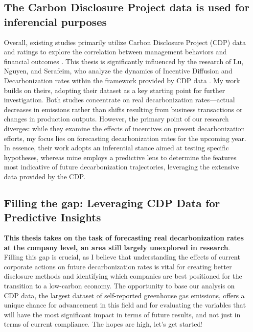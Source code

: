 \subsection{The Carbon Disclosure Project data is used for inferencial purposes}
Overall, existing studies primarily utilize Carbon Disclosure Project (CDP) data and ratings to explore the correlation between management behaviors and financial outcomes \cite{nguyen-ml, ben-amar, teob, Hassan2013Carbon}. This thesis is significantly influenced by the research of Lu, Nguyen, and Serafeim, who analyze the dynamics of Incentive Diffusion and Decarbonization rates within the framework provided by CDP data \cite{incentive-diffusion}. My work builds on theirs, adopting their dataset as a key starting point for further investigation. Both studies concentrate on real decarbonization rates—actual decreases in emissions rather than shifts resulting from business transactions or changes in production outputs. However, the primary point of our research diverges: while they examine the effects of incentives on present decarbonization efforts, my focus lies on forecasting decarbonization rates for the upcoming year. In essence, their work adopts an inferential stance aimed at testing specific hypotheses, whereas mine employs a predictive lens to determine the features most indicative of future decarbonization trajectories, leveraging the extensive data provided by the CDP.



\subsection{Filling the gap: Leveraging CDP Data for Predictive Insights}
\textbf{This thesis takes on the task of forecasting real decarbonization rates at the company level, an area still largely unexplored in research}. Filling this gap is crucial, as I believe that understanding the effects of current corporate actions on future decarbonization rates is vital for creating better disclosure methods and identifying which companies are best positioned for the transition to a low-carbon economy. The opportunity to base our analysis on CDP data, the largest dataset of self-reported greenhouse gas emissions, offers a unique chance for advancement in this field and for evaluating the variables that will have the most significant impact in terms of future results, and not just in terms of current compliance. The hopes are high, let's get started!

